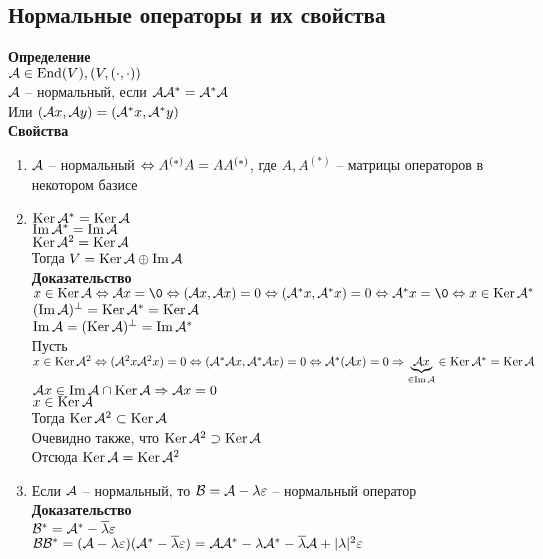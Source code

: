 \documentclass[12pt]{article}
\begin{document}
\subsection{Нормальные операторы и их свойства}
\textbf{Определение}\\
$\mcA \in \nm{End}(V), (V, (\cdot, \cdot))$\\
$\mcA$ -- нормальный, если $\mcA\mcA^* = \mcA^*\mcA$\\
Или $(\mcA x, \mcA y) = (\mcA^* x, \mcA^* y)$\\
\textbf{Свойства}
\begin{enumerate}
    \item $\mcA$ -- нормальный $\LRto A^{(*)}A = AA^{(*)} $, где $A, A^{(*)}$ -- матрицы операторов в некотором базисе
    \item $\ker \mcA^* = \ker \mcA$\\
        $\im \mcA^* = \im \mcA$\\
        $\ker \mcA^2 = \ker \mcA$\\
        Тогда $V = \ker \mcA \oplus \im \mcA $\\
        \textbf{Доказательство}\\
        $x \in \ker \mcA \LRto \mcA x = \0 \LRto (\mcA x, \mcA x) = 0 \LRto (\mcA^* x, \mcA^* x) = 0 \LRto \mcA^* x = \0 \LRto x \in \ker \mcA^*$\\
        $(\im \mcA)^\perp = \ker \mcA^* = \ker \mcA$\\
        $\im \mcA = (\ker \mcA)^\perp = \im \mcA^*$\\
        Пусть $x \in \ker \mcA^2 \LRto (\mcA^2 x \mcA^2 x) = 0 \LRto (\mcA^* \mcA x, \mcA^* \mcA x ) = 0 \LRto \mcA^*(\mcA x) = 0 \Rto \ub{\in \im \mcA}{\mcA x} \in \ker \mcA^* = \ker \mcA$\\
        $\mcA x \in \im \mcA \cap \ker \mcA \Rto \mcA x = 0$\\
        $x \in \ker \mcA$\\
        Тогда $\ker \mcA^2 \subset \ker \mcA$\\
        Очевидно также, что $\ker \mcA^2 \supset \ker \mcA$\\
        Отсюда $\ker \mcA = \ker \mcA^2$
    \item Если $\mcA$ -- нормальный, то $\mcB = \mcA - \lambda \eps$ -- нормальный оператор
        \textbf{Доказательство}\\
        $\mcB^* = \mcA^* - \ol\lambda \eps$\\
        $\mcB \mcB^* = (\mcA - \lambda\eps)(\mcA^* - \ol \lambda\eps) = \mcA \mcA^* - \lambda\mcA^* - \ol \lambda\mcA + | \lambda|^2 \eps $\\

\end{enumerate}
\end{document}
